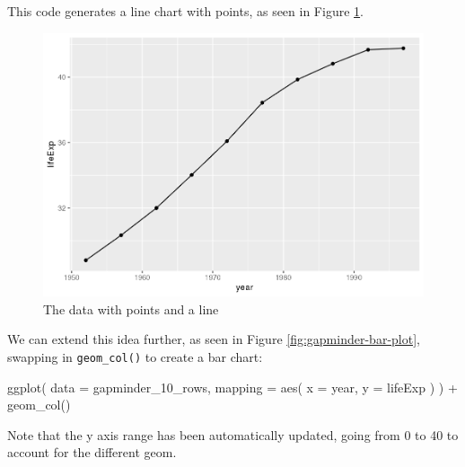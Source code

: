 \documentclass[
]{book}
\newenvironment{Shaded}{\begin{snugshade}}{\end{snugshade}}
\newcommand{\AttributeTok}[1]{\textcolor[rgb]{0.77,0.63,0.00}{#1}}
\newcommand{\FunctionTok}[1]{\textcolor[rgb]{0.00,0.00,0.00}{#1}}
\newcommand{\NormalTok}[1]{#1}
\newcommand{\SpecialCharTok}[1]{\textcolor[rgb]{0.00,0.00,0.00}{#1}}
\begin{document}
This code generates a line chart with points, as seen in Figure \ref{fig:gapminder-points-line-plot}.

\begin{figure}
\includegraphics[width=1\linewidth]{data-viz_files/figure-latex/gapminder-points-line-plot-1} \caption{The data with points and a line}\label{fig:gapminder-points-line-plot}
\end{figure}

We can extend this idea further, as seen in Figure \ref{fig:gapminder-bar-plot}, swapping in \texttt{geom\_col()} to create a bar chart:

\begin{Shaded}
\begin{Highlighting}[]
\FunctionTok{ggplot}\NormalTok{(}
  \AttributeTok{data =}\NormalTok{ gapminder\_10\_rows,}
  \AttributeTok{mapping =} \FunctionTok{aes}\NormalTok{(}
    \AttributeTok{x =}\NormalTok{ year,}
    \AttributeTok{y =}\NormalTok{ lifeExp}
\NormalTok{  )}
\NormalTok{) }\SpecialCharTok{+}
  \FunctionTok{geom\_col}\NormalTok{()}
\end{Highlighting}
\end{Shaded}

Note that the y axis range has been automatically updated, going from 0 to 40 to account for the different geom.
\end{document}
